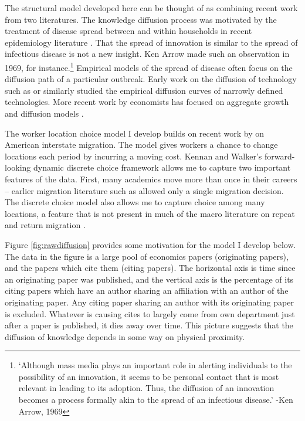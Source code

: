 The structural model developed here can be thought of as combining recent work from two literatures.
The knowledge diffusion process was motivated by the treatment of disease
spread between and within households in recent epidemiology literature \citep{cauchemez2004bayesian}.
That the spread of innovation is similar
to the spread of infectious disease is not a new insight. Ken Arrow made
such an observation in 1969, for instance.\footnote{`Although mass media
plays an important role in alerting individuals to the possibility of
an innovation, it seems to be personal contact that is most relevant
in leading to its adoption. Thus, the diffusion of an innovation
becomes a process formally akin to the spread of an infectious
disease.' -Ken Arrow, 1969}  Empirical models of the spread of disease
often focus on the diffusion path of a particular outbreak.
Early work on the diffusion of technology such as \citet{griliches1957hybrid} or \citet{rogers1962diffusion}
similarly studied the empirical diffusion curves of narrowly
defined technologies. More recent work by economists has focused on
aggregate growth and diffusion models \citep{caballero1993high, kortum1997research, eaton1999international,  lucas2008ideas, chor2013cumulative}.

The worker location choice model I develop builds on recent work by \citet{kennan2011effect} on American interstate migration.
The model gives workers a chance to change locations each period by incurring a moving cost.  Kennan and Walker's forward-looking dynamic discrete choice framework allows me to capture two important features of the data.  First, many academics move more than once in their 
careers -- earlier migration literature such as \citet{dahl2002mobility} allowed only a single migration decision.  The discrete choice model also allows me to capture choice among many locations, a feature that is not present in much of the macro literature on repeat and return migration \citep{dos2003migration, dustmann2003return}.

Figure \ref{fig:rawdiffusion} provides some
motivation for the model I develop below. The data in
the figure is a large pool of economics papers (originating papers), 
and the papers which cite them (citing papers).  The horizontal axis
is time since an originating paper was published, and the vertical
axis is the percentage of its citing papers which have an author
sharing an affiliation with an author of the originating paper.
Any citing paper sharing an author with its originating paper is
excluded. Whatever is causing cites to largely come from own department
just after a paper is published, it dies away over time. This picture
suggests that the diffusion of knowledge depends in some way on physical
proximity.

